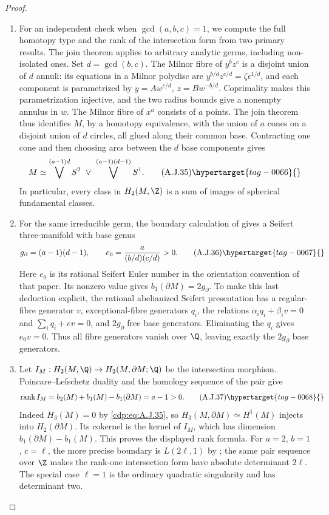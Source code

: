 \begin{proof}
\begin{enumerate}[label={$\langle1\rangle$\arabic*.},leftmargin=*]
\item For an independent check when $\gcd(a,b,c)=1$,
we compute the full homotopy type and the rank of
the intersection form from two primary results.
The join theorem
\cite[Theorem L1 and Example 2.4(a)]{Nemethi1991Join}
applies to arbitrary analytic germs, including
non-isolated ones. Set $d=\gcd(b,c)$. The Milnor
fibre of $y^bz^c$ is a disjoint union of $d$ annuli:
its equations in a Milnor polydisc are
$y^{b/d}z^{c/d}=\zeta\epsilon^{1/d}$, and each
component is parametrized by
$y=A w^{c/d}$, $z=B w^{-b/d}$. Coprimality makes
this parametrization injective, and the two radius
bounds give a nonempty annulus in $w$.
The Milnor fibre of $x^a$ consists of $a$ points.
The join theorem thus identifies $M$, by a homotopy
equivalence, with the union of $a$ cones on a
disjoint union of $d$ circles, all glued along their
common base. Contracting one cone and then choosing
arcs between the $d$ base components gives
\[
 M\simeq
 \bigvee^{(a-1)d}S^2\ \vee\
 \bigvee^{(a-1)(d-1)}S^1.                          \tag{A.J.35}\hypertarget{tag-0066}{}\label{cdp:eq:A.J.35}
\]
In particular, every class in $H_2(M,\Z)$ is a sum
of images of spherical fundamental classes.

\item For the same irreducible germ, the boundary calculation
of \cite[Theorem 4.1 and Lemma 4.6]{MPW2005Hirzebruch}
gives a Seifert three-manifold with base genus
\[
 g_\partial=(a-1)(d-1),\qquad
 e_0=\frac{a}{(b/d)(c/d)}>0.                     \tag{A.J.36}\hypertarget{tag-0067}{}\label{cdp:eq:A.J.36}
\]
Here $e_0$ is its rational Seifert Euler number in
the orientation convention of that paper. Its
nonzero value gives
$b_1(\partial M)=2g_\partial$. To make this last
deduction explicit, the rational abelianized Seifert
presentation has a regular-fibre generator $v$,
exceptional-fibre generators $q_i$, the relations
$\alpha_iq_i+\beta_iv=0$ and
$\sum_iq_i+ev=0$, and $2g_\partial$ free base
generators. Eliminating the $q_i$ gives $e_0v=0$.
Thus all fibre generators vanish over $\Q$, leaving
exactly the $2g_\partial$ base generators.

\item Let $I_M:H_2(M,\Q)\to H_2(M,\partial M;\Q)$ be
the intersection morphism. Poincare--Lefschetz duality
and the homology sequence of the pair give
\[
 \operatorname{rank} I_M
   =b_2(M)+b_1(M)-b_1(\partial M)=a-1>0.          \tag{A.J.37}\hypertarget{tag-0068}{}\label{cdp:eq:A.J.37}
\]
Indeed $H_3(M)=0$ by \eqref{cdp:eq:A.J.35}, so
$H_3(M,\partial M)\simeq H^1(M)$ injects into
$H_2(\partial M)$. Its cokernel is the kernel of
$I_M$, which has dimension
$b_1(\partial M)-b_1(M)$. This proves the displayed
rank formula. For $a=2$, $b=1$, $c=\ell$, the
more precise boundary is $L(2\ell,1)$ by
\cite[Theorem 4.2(2)]{MPW2005Hirzebruch}; the same
pair sequence over $\Z$ makes the rank-one
intersection form have absolute determinant
$2\ell$. The special case $\ell=1$ is the ordinary
quadratic singularity and has determinant two.


\end{enumerate}
\end{proof}
